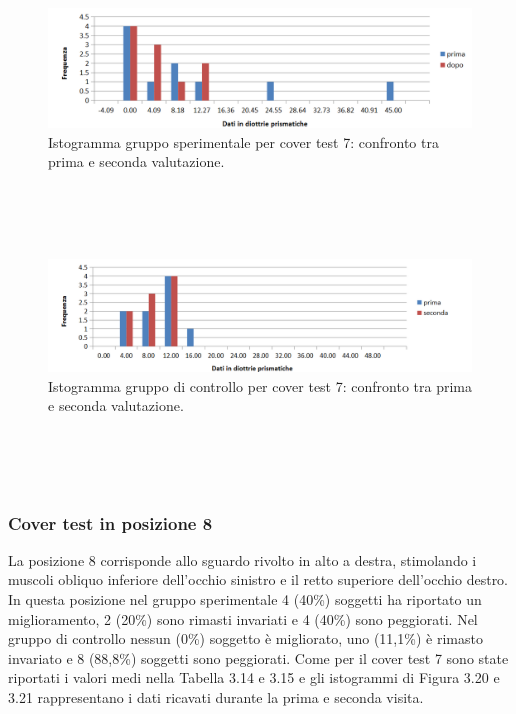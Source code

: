  \begin{figure}[h!]
	\centering
	\includegraphics[scale=0.38]{source/grafici/COVER_TEST_7_TRATTATI_NUOVO.png}
	\caption[Istogramma gruppo sperimentale per cover test 7]{Istogramma gruppo sperimentale per cover test 7: confronto tra prima e seconda valutazione.}
	\label{fig:issuexample}
\end{figure}
\\\ \\\
 \begin{figure}[h!]
	\centering
	\includegraphics[scale=0.38]{source/grafici/cover_test_7_giustissimo_non_trattati.png}
	\caption[Istogramma gruppo di controllo per cover test 7]{Istogramma gruppo di controllo per cover test 7: confronto tra prima e seconda valutazione.}
	\label{fig:issuexample}
\end{figure}
\\\ \\\
\subsubsection{Cover test in posizione 8}

La posizione 8 corrisponde allo sguardo rivolto in alto a destra, stimolando i muscoli obliquo inferiore dell’occhio sinistro e il retto superiore dell’occhio destro. In questa posizione nel gruppo sperimentale 4 (40\%) soggetti ha riportato un miglioramento, 2 (20\%) sono rimasti invariati e 4 (40\%) sono peggiorati. Nel gruppo di controllo nessun (0\%) soggetto è migliorato, uno (11,1\%) è rimasto invariato e 8 (88,8\%) soggetti sono peggiorati. Come per il cover test 7 sono state riportati i valori medi nella Tabella 3.14 e 3.15 e gli istogrammi di Figura 3.20 e 3.21 rappresentano i dati ricavati durante la prima e seconda visita.

